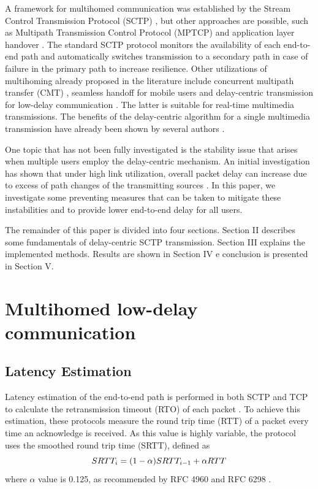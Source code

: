 \documentclass{sbrt2015}
\begin{document}
A framework for multihomed communication was established by the Stream Control Transmission Protocol (SCTP) \cite{Stewart2007a}, but other approaches are possible, such as Multipath Transmission Control Protocol (MPTCP) \cite{Ford2013}\cite{Zekri2012} and application layer handover \cite{Cunningham2004}. The standard SCTP protocol monitors the availability of each end-to-end path and automatically switches transmission to a secondary path in case of failure in the primary path to increase resilience. Other utilizations of multihoming already proposed in the literature include concurrent multipath transfer (CMT) \cite{Casetti2004}\cite{Ye2004}\cite{Iyengar2006}, seamless handoff for mobile users \cite{Koh2004}\cite{Ma2004} and delay-centric transmission for low-delay communication \cite{Kelly2004}\cite{Kashihara2004}. The latter is suitable for real-time multimedia transmissions.
The benefits of the delay-centric algorithm for a single multimedia transmission have already been shown by several authors \cite{Noonan2004b}\cite{Fitzpatrick2007}\cite{Gavriloff2009a}\cite{Runcos2010}. 

One topic that has not been fully investigated is the stability issue that arises when multiple users employ the delay-centric mechanism. An initial investigation has shown that under high link utilization, overall packet delay can increase due to excess of path changes of the transmitting sources \cite{Gavriloff2009}.
In this paper, we investigate some preventing measures that can be taken to mitigate these instabilities and to provide lower end-to-end delay for all users.

The remainder of this paper is divided into four sections. Section II describes some fundamentals of delay-centric SCTP transmission. Section III explains the implemented methods. Results are shown in Section IV e conclusion is presented in Section V.  

  \section{Multihomed low-delay communication}
  
  \subsection{Latency Estimation}

  Latency estimation of the end-to-end path is performed in both SCTP and TCP to calculate the retransmission timeout (RTO) of each packet \cite{Stewart2007a}\cite{Postel1981}. To achieve this estimation, these protocols measure the round trip time (RTT) of a packet every time an acknowledge is received. As this value is highly variable, the protocol uses the smoothed round trip time (SRTT), defined as
\begin{equation}
SRTT_i  = (1 - \alpha) SRTT_{i-1} + \alpha  RTT \\
\end{equation}
\noindent where $\alpha$ value is 0.125, as recommended by RFC 4960 \cite{Stewart2007a} and RFC 6298 \cite{Paxson2011}.
\end{document}
